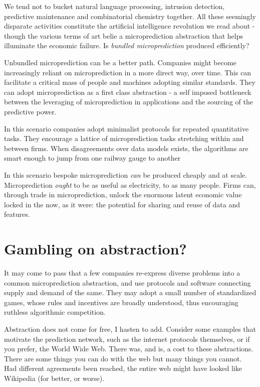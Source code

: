 We tend not to bucket natural language processing, intrusion detection, predictive maintenance and combinatorial chemistry together. All these seemingly disparate activities constitute the artificial intelligence revolution we read about - though the various terms of art belie a microprediction abstraction that helps illuminate the economic failure. Is {\em bundled microprediction} produced efficiently? 

Unbundled microprediction can be a better path. Companies might become increasingly reliant on microprediction in a more direct way, over time. This can facilitate a critical mass of people and machines adopting similar standards. They can adopt microprediction as a first class abstraction - a self imposed bottleneck between the leveraging of microprediction in applications and the sourcing of the predictive power. 

In this scenario companies adopt minimalist protocols for repeated quantitative tasks. They encourage a lattice of microprediction tasks stretching within and between firms. When disagreements over data models exists, the algorithms are smart enough to jump from one railway gauge to another

In this scenario bespoke microprediction {\em can} be produced cheaply and at scale. Microprediction {\em ought} to be as useful as electricity, to as many people. Firms can, through trade in microprediction, unlock the enormous latent economic value locked in the now, as it were: the potential for sharing and reuse of data and features.


\section{Gambling on abstraction?}

It may come to pass that a few companies re-express diverse problems into a common microprediction abstraction, and use protocols and software connecting supply and demand of the same. They may adopt a small number of standardized games, whose rules and incentives are broadly understood, thus encouraging ruthless algorithmic competition.

Abstraction does not come for free, I hasten to add.  Consider some examples that motivate the prediction network, such as the internet protocols themselves, or if you prefer, the World Wide Web. There was, and is, a cost to these abstractions. There are some things you can do with the web but many things you cannot. Had different agreements been reached, the entire web might have looked like Wikipedia (for better, or worse). 


